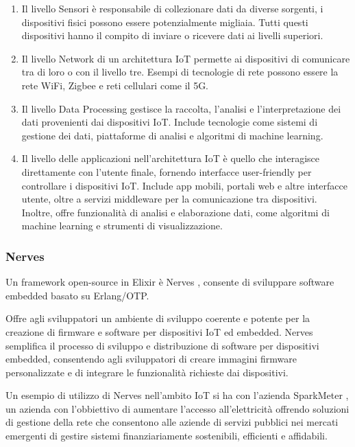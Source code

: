 \begin{enumerate}
	\item Il livello Sensori è responsabile di collezionare dati da
	diverse sorgenti, i dispositivi fisici possono essere potenzialmente
	migliaia. Tutti questi dispositivi hanno il compito di
	inviare o ricevere dati ai livelli superiori.
	\item Il livello Network di un architettura IoT permette ai
	dispositivi di comunicare tra di loro o con il livello tre.
	Esempi di tecnologie di rete possono essere la rete WiFi,
	Zigbee e reti cellulari come il 5G.
	\item Il livello Data Processing gestisce la
	raccolta, l'analisi e l'interpretazione dei dati
	provenienti dai dispositivi IoT.
	Include tecnologie come sistemi di gestione dei dati,
	piattaforme di analisi e algoritmi di machine learning.
	\item Il livello delle applicazioni nell'architettura
	IoT è quello che interagisce direttamente con 
	l'utente finale, fornendo interfacce user-friendly 
	per controllare i dispositivi IoT. 
	Include app mobili, portali web e altre interfacce utente,
	oltre a servizi middleware per la comunicazione tra dispositivi.
	Inoltre, offre funzionalità di analisi e elaborazione dati,
	come algoritmi di machine learning e strumenti di visualizzazione.
\end{enumerate}

\subsubsection{Nerves}

Un framework open-source in Elixir
è Nerves \cite{NervesPr90:online}, consente di
sviluppare software embedded basato su Erlang/OTP.

Offre agli sviluppatori un ambiente di sviluppo 
coerente e potente per la creazione di firmware
e software per dispositivi IoT ed embedded.
Nerves semplifica il processo di sviluppo e distribuzione
di software per dispositivi embedded,
consentendo agli sviluppatori di creare
immagini firmware personalizzate e di integrare le funzionalità
richieste dai dispositivi.

Un esempio di utilizzo di Nerves nell'ambito IoT si ha
con l'azienda SparkMeter \cite{SparkMet65:online},
un azienda con l'obbiettivo di aumentare l'accesso all'elettricità
offrendo soluzioni di gestione della rete che 
consentono alle aziende di servizi pubblici nei mercati emergenti
di gestire sistemi finanziariamente sostenibili,
efficienti e affidabili.

